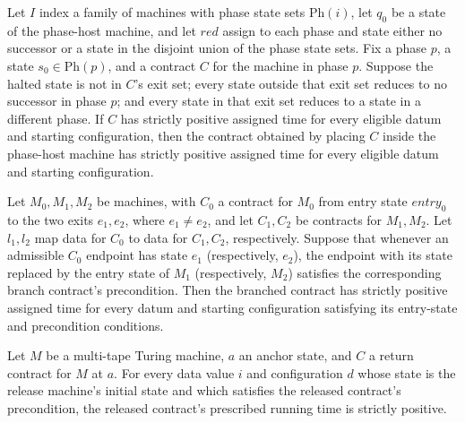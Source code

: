 \begin{theorem}
\label{Turing.Contract.inPhase_positive}
\leanok
{}
Let $I$ index a family of machines with phase state sets $\mathrm{Ph}(i)$, let $q_0$ be
a state of the phase-host machine, and let $red$ assign to each phase and state either
no successor or a state in the disjoint union of the phase state sets. Fix a phase $p$,
a state $s_0\in\mathrm{Ph}(p)$, and a contract $C$ for the machine in phase $p$. Suppose
the halted state is not in $C$'s exit set; every state outside that exit set reduces to
no successor in phase $p$; and every state in that exit set reduces to a state in a
different phase. If $C$ has strictly positive assigned time for every eligible datum and
starting configuration, then the contract obtained by placing $C$ inside the phase-host
machine has strictly positive assigned time for every eligible datum and starting
configuration.
\end{theorem}

\begin{theorem}
\label{Turing.Contract.branch_positive}
\leanok
{}
Let $M_0,M_1,M_2$ be machines, with $C_0$ a contract for $M_0$ from entry state
$entry_0$ to the two exits $e_1,e_2$, where $e_1\ne e_2$, and let $C_1,C_2$ be contracts
for $M_1,M_2$. Let $l_1,l_2$ map data for $C_0$ to data for $C_1,C_2$, respectively.
Suppose that whenever an admissible $C_0$ endpoint has state $e_1$ (respectively,
$e_2$), the endpoint with its state replaced by the entry state of $M_1$ (respectively,
$M_2$) satisfies the corresponding branch contract's precondition. Then the branched
contract has strictly positive assigned time for every datum and starting configuration
satisfying its entry-state and precondition conditions.
\end{theorem}

\begin{theorem}
\label{Turing.ReturnContract.release_positive}
\leanok
{}
Let $M$ be a multi-tape Turing machine, $a$ an anchor state, and $C$ a return contract
for $M$ at $a$. For every data value $i$ and configuration $d$ whose state is the
release machine's initial state and which satisfies the released contract's
precondition, the released contract's prescribed running time is strictly positive.
\end{theorem}

